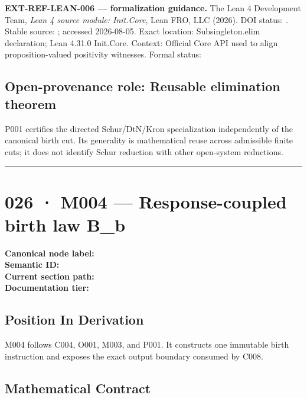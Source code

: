 \textbf{EXT-REF-LEAN-006 --- formalization guidance.} The Lean 4
Development Team, \emph{Lean 4 source module: Init.Core}, Lean FRO, LLC
(2026). DOI status: \texttt{\protect{}}. Stable
source:
\texttt{\protect{}};
accessed 2026-08-05. Exact location: Subsingleton.elim declaration; Lean
4.31.0 Init.Core. Context: Official Core API used to align
proposition-valued positivity witnesses. Formal status:
\texttt{\protect{}}

\subsection{Open-provenance role: Reusable elimination
theorem}\label{open-provenance-role-reusable-elimination-theorem}

P001 certifies the directed Schur/DtN/Kron specialization independently
of the canonical birth cut. Its generality is mathematical reuse across
admissible finite cuts; it does not identify Schur reduction with other
open-system reductions.

\begin{center}\rule{0.5\linewidth}{0.5pt}\end{center}

\section{026 · M004 --- Response-coupled birth law
B\_b}\label{m004-response-coupled-birth-law-b_b}

\textbf{Canonical node label:} \texttt{\protect{}}\\
\textbf{Semantic ID:} \texttt{\protect{}}\\
\textbf{Current section path:} \texttt{\protect{}}\\
\textbf{Documentation tier:} \texttt{\protect{}}

\subsection{Position In Derivation}\label{position-in-derivation-22}

M004 follows C004, O001, M003, and P001. It constructs one immutable
birth instruction and exposes the exact output boundary consumed by
C008.

\subsection{Mathematical Contract}\label{mathematical-contract-9}

